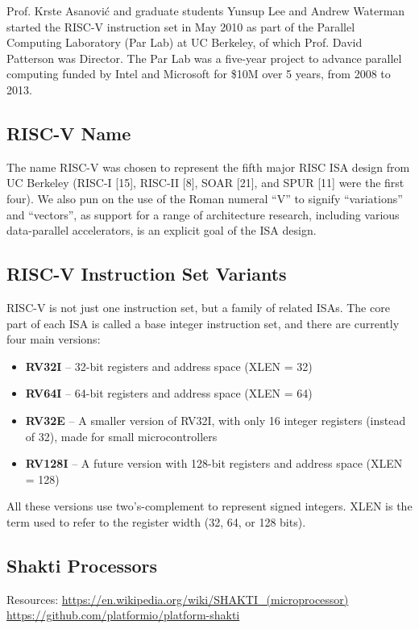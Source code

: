 \documentclass[12pt, a4paper]{article}
\begin{document}
Prof. Krste Asanović and graduate students Yunsup Lee and Andrew Waterman started the RISC-V instruction set in May 2010 as part of the Parallel Computing Laboratory (Par Lab) at UC Berkeley, of which Prof. David Patterson was Director. The Par Lab was a five-year project to advance parallel computing funded by Intel and Microsoft for \$10M over 5 years, from 2008 to 2013.

\subsection{RISC-V Name}
The name RISC-V was chosen to represent the fifth major RISC ISA design from UC Berkeley (RISC-I [15], RISC-II [8], SOAR [21], and SPUR [11] were the first four). We also pun on the use of the Roman numeral “V” to signify “variations” and “vectors”, as support for a range of architecture research, including various data-parallel accelerators, is an explicit goal of the ISA design.

\subsection{RISC-V Instruction Set Variants}
RISC-V is not just one instruction set, but a family of related ISAs. The core part of each ISA is called a base integer instruction set, and there are currently four main versions:

\begin{itemize}[nosep]
    \item \textbf{RV32I} – 32-bit registers and address space (XLEN = 32)
    \item \textbf{RV64I} – 64-bit registers and address space (XLEN = 64)
    \item \textbf{RV32E} – A smaller version of RV32I, with only 16 integer registers (instead of 32), made for small microcontrollers
    \item \textbf{RV128I} – A future version with 128-bit registers and address space (XLEN = 128)
\end{itemize}

All these versions use two's-complement to represent signed integers.
XLEN is the term used to refer to the register width (32, 64, or 128 bits).

\subsection{Shakti Processors}
Resources: \url{https://en.wikipedia.org/wiki/SHAKTI_(microprocessor)} \\
\url{https://github.com/platformio/platform-shakti} \\
\end{document}
